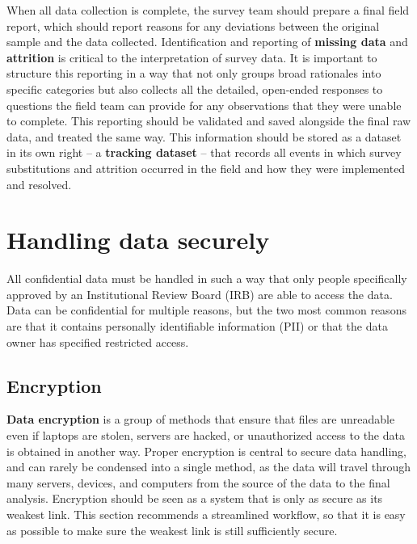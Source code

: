 When all data collection is complete,
the survey team should prepare a final field report,
which should report reasons for any deviations between the original sample and the data collected.
Identification and reporting of \textbf{missing data} and \textbf{attrition}
is critical to the interpretation of survey data.
It is important to structure this reporting in a way that not only
groups broad rationales into specific categories
but also collects all the detailed, open-ended responses
to questions the field team can provide for any observations that they were unable to complete.
This reporting should be validated and saved alongside the final raw data, and treated the same way.
This information should be stored as a dataset in its own right
-- a \textbf{tracking dataset} -- that records all events in which survey substitutions
and attrition occurred in the field and how they were implemented and resolved.


\section{Handling data securely}

All confidential data must be handled in such a way that only people specifically
approved by an Institutional Review Board (IRB)
are able to access the data.
Data can be confidential for multiple reasons, but the two most
common reasons are that it contains personally identifiable information (PII)
or that the data owner has specified restricted access.


\subsection{Encryption}

\textbf{Data encryption}
is a group of methods that ensure that files are unreadable
even if laptops are stolen, servers are hacked,
or unauthorized access to the data is obtained in another way.
Proper encryption is central to secure data handling,
and can rarely be condensed into a single method,
as the data will travel through many servers, devices, and computers
from the source of the data to the final analysis.
Encryption should be seen as a system
that is only as secure as its weakest link.
This section recommends a streamlined workflow,
so that it is easy as possible to make sure
the weakest link is still sufficiently secure.

